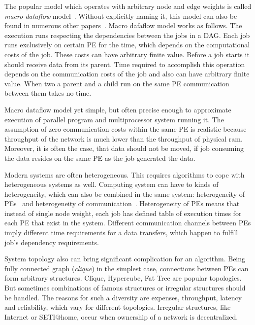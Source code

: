 The popular model which operates with arbitrary node and edge weights
is called \emph{macro dataflow}
model~\cite{yang1992pyrros,wu1990hypertool}.  Without explicitly
naming it, this model can also be found in numerous other
papers~\cite{adam1974, kwok1999static, sakellariou2004low}. Macro dafaflow
model works as follows. The execution runs respecting the dependencies
between the jobs in a DAG. Each job runs exclusively on certain PE for
the time, which depends on the computational  costs of the job. These costs can have arbitrary
finite value. Before a job starts it should receive data from its
parent. Time required to accomplish this operation depends on the
communication costs of the job and also can have arbitrary finite
value. When two a parent and a child run on the same PE communication
between them takes no time.

Macro dataflow model yet simple, but often precise enough to
approximate execution of parallel program and multiprocessor system
running it. The assumption of zero communication costs within the same
PE is realistic because throughput of the network is much lower than
the throughput of physical ram. Moreover, it is often the case, that
data should not be moved, if job consuming the data resides on the
same PE as the job generated the data.

Modern systems are often heterogeneous. This requires algorithms to
cope with heterogeneous systems as well. Computing system can have to
kinds of heterogeneity, which can also be combined in the same system:
heterogeneity of PEs~\cite{grajcar1999genetic, Topcuoglu2002,
  arabnejad2014list} and heterogeneity of
communication~\cite{arabnejad2014list,
  bittencourt2010dag}. Heterogeneity of PEs means that instead of
single node weight, each job has defined table of execution times for
each PE that exist in the system. Different communication channels
between PEs imply different time requirements for a data transfers,
which happen to fulfill job's dependency requirements.

System topology also can bring significant complication for an
algorithm. Being fully connected graph (\emph{clique}) in the simplest
case, connections between PEs can form arbitrary structures. Clique,
Hypercube, Fat Tree are popular topologies. But sometimes combinations
of famous structures or irregular structures should be handled. The
reasons for such a diversity are expenses, throughput, latency and
reliability, which vary for different topologies. Irregular
structures, like Internet or SETI@home, occur when ownership of a
network is decentralized.

